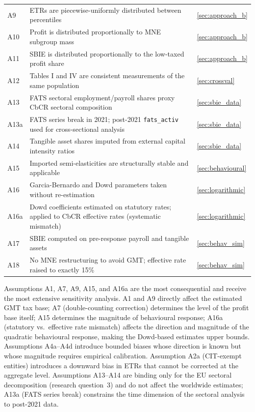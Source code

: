 \documentclass[11pt,a4paper]{article}
\newcommand{\code}[1]{\texttt{#1}}
\begin{document}
\begin{longtable}{@{}lp{10cm}l@{}}
A9 & ETRs are piecewise-uniformly distributed between percentiles & \ref{sec:approach_b} \\
A10 & Profit is distributed proportionally to MNE subgroup mass & \ref{sec:approach_b} \\
A11 & SBIE is distributed proportionally to the low-taxed profit share & \ref{sec:approach_b} \\
A12 & Tables I and IV are consistent measurements of the same population & \ref{sec:crossval} \\
A13 & FATS sectoral employment/payroll shares proxy CbCR sectoral composition & \ref{sec:sbie_data} \\
A13a & FATS series break in 2021; post-2021 \code{fats\_activ} used for cross-sectional analysis & \ref{sec:sbie_data} \\
A14 & Tangible asset shares imputed from external capital intensity ratios & \ref{sec:sbie_data} \\
A15 & Imported semi-elasticities are structurally stable and applicable & \ref{sec:behavioural} \\
A16 & Garcia-Bernardo and Dowd parameters taken without re-estimation & \ref{sec:logarithmic} \\
A16a & Dowd coefficients estimated on statutory rates; applied to CbCR effective rates (systematic mismatch) & \ref{sec:logarithmic} \\
A17 & SBIE computed on pre-response payroll and tangible assets & \ref{sec:behav_sim} \\
A18 & No MNE restructuring to avoid GMT; effective rate raised to exactly 15\% & \ref{sec:behav_sim} \\
\end{longtable}

Assumptions A1, A7, A9, A15, and A16a are the most consequential and receive the most extensive sensitivity analysis. A1 and A9 directly affect the estimated GMT tax base; A7 (double-counting correction) determines the level of the profit base itself; A15 determines the magnitude of behavioural response; A16a (statutory vs.\ effective rate mismatch) affects the direction and magnitude of the quadratic behavioural response, making the Dowd-based estimates upper bounds. Assumptions A4a--A4d introduce bounded biases whose direction is known but whose magnitude requires empirical calibration. Assumption A2a (CIT-exempt entities) introduces a downward bias in ETRs that cannot be corrected at the aggregate level. Assumptions A13--A14 are binding only for the EU sectoral decomposition (research question~3) and do not affect the worldwide estimates; A13a (FATS series break) constrains the time dimension of the sectoral analysis to post-2021 data.

\newpage
\printbibliography
\end{document}
